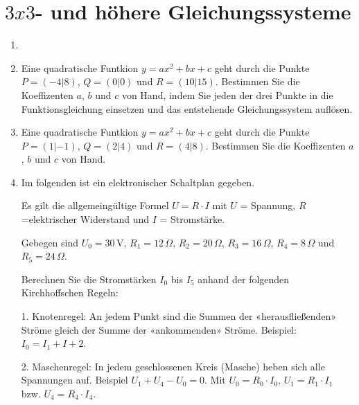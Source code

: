\section{$3x3$- und höhere Gleichungssysteme}

\begin{enumerate}[label=\alph*)]
\item
{}
\item
Eine quadratische Funtkion $y=ax^2 + bx + c$ geht durch die Punkte
$P=(-4|8)$, $Q=(0|0)$ und $R=(10|15)$. Bestimmen Sie die Koeffizenten
$a$, $b$ und $c$ von Hand, indem Sie jeden der drei Punkte in die
Funktionsgleichung einsetzen und das entstehende Gleichungssystem
auf\/lösen.

\item
Eine quadratische Funtkion $y=ax^2 + bx + c$ geht durch die Punkte
$P=(1|-1)$, $Q=(2|4)$ und $R=(4|8)$. Bestimmen Sie die Koeffizenten
$a$, $b$ und $c$ von Hand.

\item
Im folgenden ist ein elektronischer Schaltplan gegeben.


Es gilt die allgemeingültige Formel $U=R\cdot{}I$ mit $U$ = Spannung,
$R$=elektrischer Widerstand und $I$ = Stromstärke.

Gebegen sind
$U_0 = 30\,\text{V}$, 
$R_1 = 12\,\Omega$,
$R_2 = 20\,\Omega$,
$R_3 = 16\,\Omega$,
$R_4 = 8\,\Omega$ und
$R_5 = 24\,\Omega$.

Berechnen Sie die Stromstärken $I_0$ bis $I_5$ anhand der folgenden
Kirchhoffschen Regeln:

1. Knotenregel: An jedem Punkt sind die Summen der «herausfließenden»
Ströme gleich der Summe der «ankommenden» Ströme. Beispiel: $I_0 = I_1
+ I+2$.

2. Maschenregel: In jedem geschlossenen Kreis (Masche) heben sich alle
Spannungen auf. Beispiel $U_1 + U_4 - U_0 = 0$. Mit
$U_0 = R_0 \cdot{} I_0$,
$U_1 = R_1 \cdot{} I_1$ bzw. 
$U_4 = R_4 \cdot{} I_4$.



\end{enumerate}
\newpage



